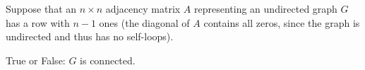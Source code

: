 \begin{prob}
    Suppose that an $n \times n$ adjacency matrix $A$ representing an undirected
    graph $G$ has a row with $n - 1$ ones (the diagonal of $A$ contains all zeros, since
    the graph is undirected and thus has no self-loops).

    True or False: $G$ is connected.

    \Tf{}

\end{prob}
